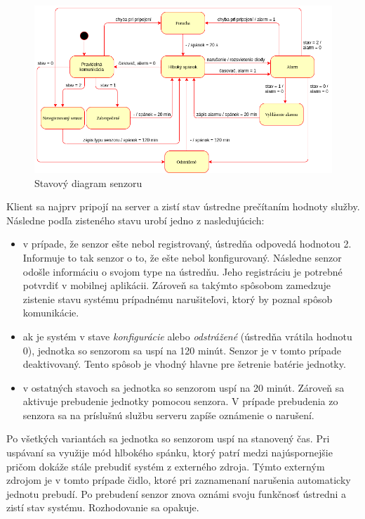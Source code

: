 \begin{figure}[ht]
    \centering
    \includegraphics[width=\linewidth]{obrazky-figures/sensor_state_diagram.png}
    \caption[Stavový diagram senzoru]{Stavový diagram senzoru}
    \label{fig:sensor_state_diagram}
\end{figure}


Klient sa najprv pripojí na server a zistí stav ústredne prečítaním hodnoty služby. Následne podľa zisteného stavu urobí jedno z nasledujúcich:
\begin{itemize}
    \item v prípade, že senzor ešte nebol registrovaný, ústredňa odpovedá hodnotou 2. Informuje to tak senzor o to, že ešte nebol konfigurovaný. Následne senzor odošle informáciu o svojom type na ústredňu. Jeho registráciu je potrebné potvrdiť v mobilnej aplikácii. Zároveň sa takýmto spôsobom zamedzuje zistenie stavu systému prípadnému narušiteľovi, ktorý by poznal spôsob komunikácie.
    \item ak je systém v stave \textit{konfigurácie} alebo \textit{odstrážené} (ústredňa vrátila hodnotu 0), jednotka so senzorom sa uspí na 120 minút. Senzor je v tomto prípade deaktivovaný. Tento spôsob je vhodný hlavne pre šetrenie batérie jednotky.
    \item v ostatných stavoch sa jednotka so senzorom uspí na 20 minút. Zároveň sa aktivuje prebudenie jednotky pomocou senzora. V prípade prebudenia zo senzora sa na príslušnú službu serveru zapíše oznámenie o narušení.
\end{itemize}

Po všetkých variantách sa jednotka so senzorom uspí na stanovený čas. Pri uspávaní sa využije mód hlbokého spánku, ktorý patrí medzi najúspornejšie pričom dokáže stále prebudiť systém z externého zdroja. Týmto externým zdrojom je v tomto prípade čidlo, ktoré pri zaznamenaní narušenia automaticky jednotu prebudí. Po prebudení senzor znova oznámi svoju funkčnosť ústredni a zistí stav systému. Rozhodovanie sa opakuje.

